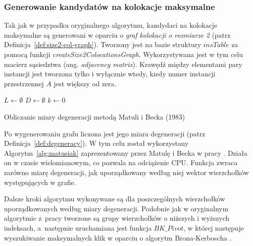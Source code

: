 \documentclass[12pt]{article}
\begin{document}
\subsubsection{Generowanie kandydatów na kolokacje maksymalne}
\label{subsec:kerbosz}

Tak jak w przypadku oryginalnego algorytmu, kandydaci na kolokacje maksymalne są generowani w oparciu o \textit{graf kolokacji o rozmiarze 2} (patrz Definicja~\ref{def:size2-col-graph}). Tworzony jest na bazie struktury $ insTable $ za pomocą funkcji \textit{createSize2ColocationsGraph}. Wykorzystywana jest w tym celu macierz sąsiedztwa (ang. \textit{adjacency matrix}). Krawędź między elementami pary instancji jest tworzona tylko i wyłącznie wtedy, kiedy numer instancji przestrzennej $ A $ jest większy od zera. 

\begin{algorithm}
$L \leftarrow \emptyset$\; 
$D \leftarrow \emptyset$\;
$k \leftarrow 0$\;
\caption{Obliczanie miary degeneracji metodą Matuli i Becka (1983)}
\label{alg:matusiak}
\end{algorithm}

Po wygenerowaniu grafu liczona jest jego miara degeneracji (patrz Definicja~\ref{def:degeneracy}). W tym celu został wykorzystany Algorytm~\ref{alg:matusiak} zaprezentowany przez Matulę i Becka w pracy \cite{matusiak}. Działa on w czasie wielomianowym, co pozwala na odciążenie CPU. Funkcja zwraca zarówno miarę degeneracji, jak uporządkowany według niej wektor wierzchołków występujących w grafie.

Dalsze kroki algorytmu wykonywane są dla poszczególnych wierzchołków uporządkowanych według miary degeneracji. Podobnie jak w oryginalnym algorytmie z~pracy \cite{pivot} tworzone są grupy wierzchołków o niższych i wyższych indeksach, a~następnie uruchamiana jest funkcja $ BK\_Pivot $, w której następuje wyszukiwanie maksymalnych klik w oparciu o algorytm Brona-Kerboscha \cite{kerbosz}. 
\end{document}
